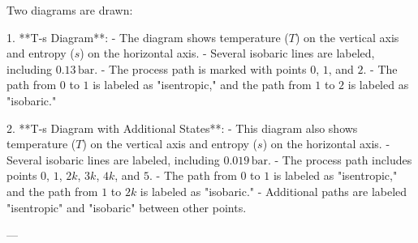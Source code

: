 Two diagrams are drawn:  

1. **T-s Diagram**:  
   - The diagram shows temperature (\( T \)) on the vertical axis and entropy (\( s \)) on the horizontal axis.  
   - Several isobaric lines are labeled, including \( 0.13 \, \text{bar} \).  
   - The process path is marked with points \( 0 \), \( 1 \), and \( 2 \).  
   - The path from \( 0 \) to \( 1 \) is labeled as "isentropic," and the path from \( 1 \) to \( 2 \) is labeled as "isobaric."  

2. **T-s Diagram with Additional States**:  
   - This diagram also shows temperature (\( T \)) on the vertical axis and entropy (\( s \)) on the horizontal axis.  
   - Several isobaric lines are labeled, including \( 0.019 \, \text{bar} \).  
   - The process path includes points \( 0 \), \( 1 \), \( 2k \), \( 3k \), \( 4k \), and \( 5 \).  
   - The path from \( 0 \) to \( 1 \) is labeled as "isentropic," and the path from \( 1 \) to \( 2k \) is labeled as "isobaric."  
   - Additional paths are labeled "isentropic" and "isobaric" between other points.  

---